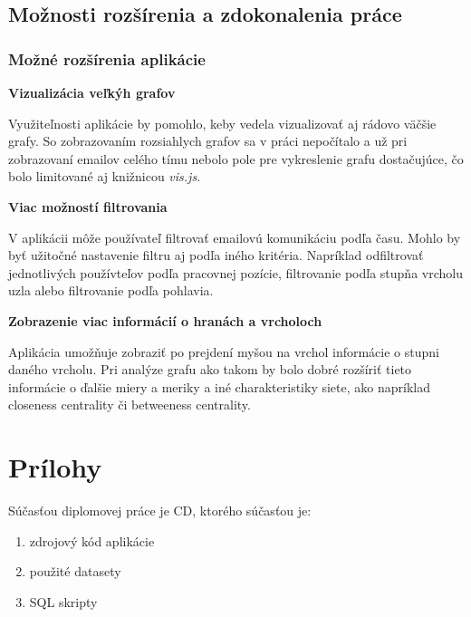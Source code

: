 \documentclass[slovak,master,public,dept460,male,cpdeclaration,oneside]{diploma}
\begin{document}
\subsection{Možnosti rozšírenia a zdokonalenia práce}

\subsubsection{Možné rozšírenia aplikácie}

\begin{description}
\item \textbf{Vizualizácia veľkýh grafov}


Využiteľnosti aplikácie by pomohlo, keby vedela vizualizovať aj rádovo väčšie grafy. So zobrazovaním rozsiahlych grafov sa v práci nepočítalo a už pri zobrazovaní emailov celého  tímu nebolo pole pre vykreslenie grafu dostačujúce, čo bolo limitované aj knižnicou \textit{vis.js}.


\item \textbf{Viac možností filtrovania}

V aplikácii môže používateľ filtrovať emailovú komunikáciu podľa času. Mohlo by byť užitočné nastavenie filtru aj podľa iného kritéria. Napríklad odfiltrovať jednotlivých používteľov podľa pracovnej pozície, filtrovanie podľa stupňa vrcholu uzla alebo filtrovanie podľa pohlavia.


\item \textbf{Zobrazenie viac informácií o hranách a vrcholoch}

Aplikácia umožňuje zobraziť po prejdení myšou na vrchol informácie o stupni daného vrcholu. Pri analýze grafu ako takom by bolo dobré rozšíriť tieto informácie o ďalšie miery a meriky a iné charakteristiky siete, ako napríklad closeness centrality či betweeness centrality.


\end{description}


 



\section{Prílohy}

Súčasťou diplomovej práce je CD, ktorého súčasťou je:
\begin{enumerate}
\item zdrojový kód aplikácie
\item použité datasety
\item SQL skripty
\end{enumerate}
\end{document}
